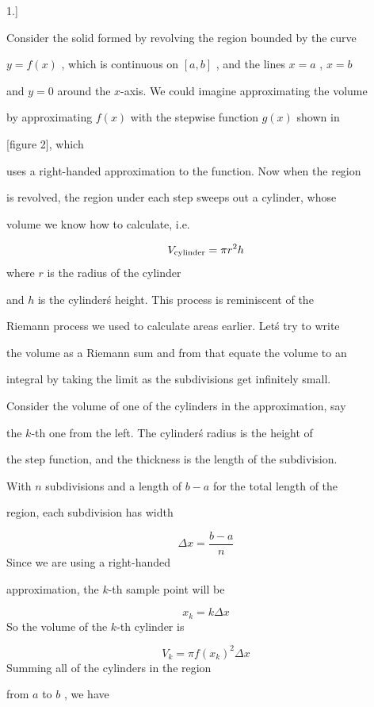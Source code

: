 1.]



Consider the solid formed by revolving the region bounded by the curve

$y=f(x)$ , which is continuous on $[a,b]$ , and the lines $x=a$ , $x=b$

and $y=0$ around the $x$-axis. We could imagine approximating the volume

by approximating $f(x)$ with the stepwise function $g(x)$ shown in

[figure 2], which

uses a right-handed approximation to the function. Now when the region

is revolved, the region under each step sweeps out a cylinder, whose

volume we know how to calculate, i.e.



$$V _{\rm cylinder}=\pi r^2 h$$ where $r$ is the radius of the cylinder

and $h$ is the cylinder\'s height. This process is reminiscent of the

Riemann process we used to calculate areas earlier. Let\'s try to write

the volume as a Riemann sum and from that equate the volume to an

integral by taking the limit as the subdivisions get infinitely small.



Consider the volume of one of the cylinders in the approximation, say

the $k$-th one from the left. The cylinder\'s radius is the height of

the step function, and the thickness is the length of the subdivision.

With $n$ subdivisions and a length of $b-a$ for the total length of the

region, each subdivision has width



$$\Delta x=\frac{b-a}{n}$$ Since we are using a right-handed

approximation, the $k$-th sample point will be



$$x _k=k\Delta x$$ So the volume of the $k$-th cylinder is



$$V _k=\pi f(x _k)^2\Delta x$$ Summing all of the cylinders in the region

from $a$ to $b$ , we have



